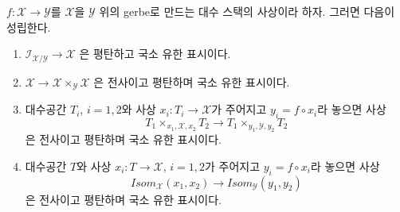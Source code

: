 \begin{lemma}
\label{lemma-gerbe-isom-fppf}
$f : \mathcal{X} \to \mathcal{Y}$를 $\mathcal{X}$을 $\mathcal{Y}$ 위의
gerbe로 만드는 대수 스택의 사상이라 하자. 그러면 다음이 성립한다.
\begin{enumerate}
\item $\mathcal{I}_{\mathcal{X}/\mathcal{Y}} \to \mathcal{X}$
은 평탄하고 국소 유한 표시이다.
\item $\mathcal{X} \to \mathcal{X} \times_\mathcal{Y} \mathcal{X}$
은 전사이고 평탄하며 국소 유한 표시이다.
\item 대수공간 $T_i$, $i = 1, 2$와 사상
$x_i : T_i \to \mathcal{X}$가 주어지고 $y_i = f \circ x_i$라 놓으면 사상
$$
T_1 \times_{x_1, \mathcal{X}, x_2} T_2 \longrightarrow
T_1 \times_{y_1, \mathcal{Y}, y_2} T_2
$$
은 전사이고 평탄하며 국소 유한 표시이다.
\item 대수공간 $T$와 사상
$x_i : T \to \mathcal{X}$, $i = 1, 2$가 주어지고
$y_i = f \circ x_i$라 놓으면 사상
$$
\mathit{Isom}_\mathcal{X}(x_1, x_2) \longrightarrow
\mathit{Isom}_\mathcal{Y}(y_1, y_2)
$$
은 전사이고 평탄하며 국소 유한 표시이다.
\end{enumerate}
\end{lemma}

